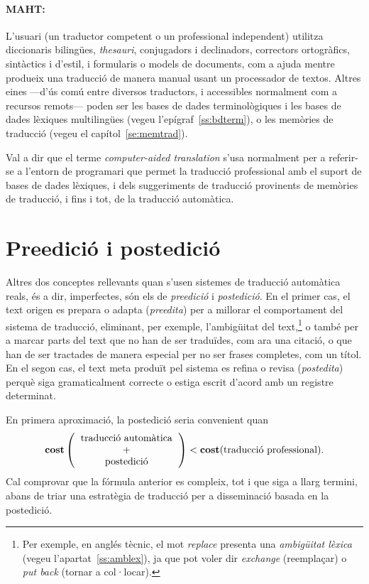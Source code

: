 \paragraph{MAHT:} L'usuari (un traductor competent o un professional
independent) utilitza diccionaris bilingües, \emph{thesauri},
conjugadors i declinadors, correctors ortogràfics, sintàctics i
d'estil, i formularis o models de documents, com a ajuda mentre
produeix una traducció de manera manual usant un processador de
textos. Altres eines ---d'ús comú entre diversos traductors, i
accessibles normalment com a recursos remots--- poden ser les bases de
dades terminològiques i les bases de dades lèxiques multilingües
(vegeu l'epígraf~\ref{ss:bdterm}), o les memòries de traducció (vegeu
el capítol~\ref{se:memtrad}). 

Val a dir que el terme \emph{computer-aided translation} s'usa
normalment per a referir-se a l'entorn de programari que permet la
traducció professional amb el suport de bases de dades lèxiques, i
dels suggeriments de traducció provinents de memòries de traducció, i
fins i tot, de la traducció automàtica.

\section{Preedició i postedició} 
\label{ss:preedposted}

Altres dos conceptes rellevants quan s'usen sistemes de traducció
automàtica reals, és a dir, imperfectes, són els de \emph{preedició} i
{\em postedició}.  En el primer cas, el text origen es prepara o
adapta (\emph{preedita}) per a millorar el comportament del sistema de
traducció, eliminant, per exemple, l'ambigüitat del text,\footnote{Per
  exemple, en anglés tècnic, el mot \emph{replace} presenta una {\em
    ambigüitat lèxica} (vegeu l'apartat~\ref{ss:amblex}), ja que pot
  voler dir \emph{exchange} (reemplaçar) o \emph{put back} (tornar a
  col·locar).} o també per a marcar parts del text que no han de ser
traduïdes, com ara una citació, o que han de ser tractades de manera
especial per no ser frases completes, com un títol.  En el segon cas,
el text meta produït pel sistema es refina o revisa ({\em postedita})
perquè siga gramaticalment correcte o estiga escrit d'acord amb un
registre determinat.

  En primera aproximació, la postedició seria convenient quan
  $$\textbf{cost}\left(\mbox{\begin{tabular}{c}traducció automàtica\\ +\\
        postedició\end{tabular}}\right) <
  \textbf{cost}(\mbox{traducció professional}).
  $$
  \label{pg:cost}
  Cal comprovar que la fórmula anterior es compleix, tot i que siga a
  llarg termini, abans de triar una estratègia de traducció per a
  disseminació basada en la postedició.  

